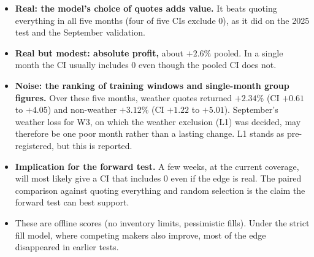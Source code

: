 \documentclass[11pt,a4paper]{article}
\begin{document}
\begin{itemize}
  \item \textbf{Real: the model's choice of quotes adds value.} It beats quoting everything in all five months
        (four of five CIs exclude 0), as it did on the 2025 test and the September validation.
  \item \textbf{Real but modest: absolute profit,} about $+2.6\%$ pooled. In a single month the CI usually
        includes 0 even though the pooled CI does not.
  \item \textbf{Noise: the ranking of training windows and single-month group figures.} Over these five months,
        weather quotes returned $+2.34\%$ (CI $+0.61$ to $+4.05$) and non-weather $+3.12\%$ (CI $+1.22$ to
        $+5.01$). September's weather loss for W3, on which the weather exclusion (L1) was decided, may therefore
        be one poor month rather than a lasting change. L1 stands as pre-registered, but this is reported.
  \item \textbf{Implication for the forward test.} A few weeks, at the current coverage, will most likely give a CI
        that includes 0 even if the edge is real. The paired comparison against quoting everything and random
        selection is the claim the forward test can best support.
  \item These are offline scores (no inventory limits, pessimistic fills). Under the strict fill model, where
        competing makers also improve, most of the edge disappeared in earlier tests.
\end{itemize}
\end{document}
